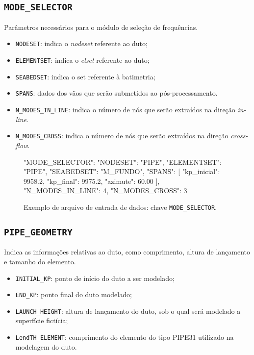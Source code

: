 \subsection{\texttt{MODE\_SELECTOR}}

Parâmetros necessários para o módulo de seleção de frequências.

\begin{itemize}
  \item \texttt{NODESET}: indica o \textit{nodeset} referente ao duto;
  \item \texttt{ELEMENTSET}: indica o \textit{elset} referente ao duto;
  \item \texttt{SEABEDSET}: indica o set referente à batimetria;
  \item \texttt{SPANS}: dados dos vãos que serão submetidos ao pós-processamento.
  \item \texttt{N\_MODES\_IN\_LINE}: indica o número de nós que serão extraídos na direção \textit{in-line}.
  \item \texttt{N\_MODES\_CROSS}: indica o número de nós que serão extraídos na direção \textit{cross-flow}.
\end{itemize}

\begin{figure}
\caption{Exemplo de arquivo de entrada de dados: chave \texttt{MODE\_SELECTOR}.\label{lst:mode-selector}}
\begin{jsoncode}
{
  "MODE_SELECTOR": {
    "NODESET": "PIPE",
    "ELEMENTSET": "PIPE",
    "SEABEDSET": "M_FUNDO",
    "SPANS": [
        {
          "kp_inicial": 9958.2,
          "kp_final": 9975.2,
          "azimute": 60.00
        }
      ],
    "N_MODES_IN_LINE": 4,
    "N_MODES_CROSS": 3
  }
}
\end{jsoncode}
\end{figure}


\subsection{\texttt{PIPE\_GEOMETRY}}


Indica as informações relativas ao duto, como comprimento, altura de lançamento e tamanho do elemento.

\begin{itemize}
  \item \texttt{INITIAL\_KP}: ponto de início do duto a ser modelado;
  \item \texttt{END\_KP}: ponto final do duto modelado;
  \item \texttt{LAUNCH\_HEIGHT}: altura de lançamento do duto, sob o qual será modelado a superfície fictícia;
  \item \texttt{LendTH\_ELEMENT}: comprimento do elemento do tipo PIPE31 utilizado na modelagem do duto.
\end{itemize}

